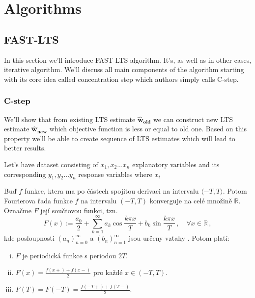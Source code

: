 
\chapter{Algorithms}

\section{FAST-LTS}
In this section we'll introduce FAST-LTS algorithm\cite{rouss:2000}. 
It's, as well as in other cases, iterative algorithm. We'll discuss all main components
of the algorithm starting with its core idea called concentration step which 
authors simply calls C-step.
\newcommand{\paramhat}[1]{\boldsymbol{\hat{\textbf{#1}}}}
\newcommand{\param}[1]{\textbf{\text{#1}}}

\subsection{C-step}
We'll show that from existing LTS estimate $\boldsymbol{\hat{w}_{old}}$ we 
can construct new LTS estimate $\boldsymbol{\hat{w}_{new}}$ which objective 
function is less or equal to old one. Based on this property we'll be able 
to create sequence of LTS estimates which will lead to better results.


\begin{veta}
Let's have dataset consisting of $x_1, x_2 ... x_n$ explanatory variables and its
corresponding $y_1, y_2 ... y_n$ response variables where $x_i $
\end{veta}




\begin{veta}\label{vet:Fourier_exp}
Buď $f$ funkce, ktera ma\cite{rouss:2000} po částech spojitou derivaci na intervalu $\langle-T,T\rangle$. Potom Fourierova řada funkce $f$ na intervalu $(-T,T)$ konverguje na celé množině $\mathbb{R}$. Označme $F$
její součtovou funkci, tzn.
\[
	F(x):=\frac{a_0}{2} + \sum_{k=1}^\infty a_k \cos\frac{k\pi x}{T} + b_k \sin\frac{k\pi x}{T}\,, \quad \forall x\in\mathbb{R}\,,
\]
kde posloupnosti $(a_n)_{n=0}^{\infty}$ a $(b_n)_{n=1}^{\infty}$ jsou určeny vztahy . Potom platí:
\begin{enumerate}[(i)]
	\item $F$ je periodická funkce s periodou $2T$.
	\item $\displaystyle F(x)=\frac{f(x+)+f(x-)}{2}$ pro každé $x\in(-T,T)$.
	\item $\displaystyle F(T)=F(-T)=\frac{f(-T+)+f(T-)}{2}$.
\end{enumerate}

\end{veta}

